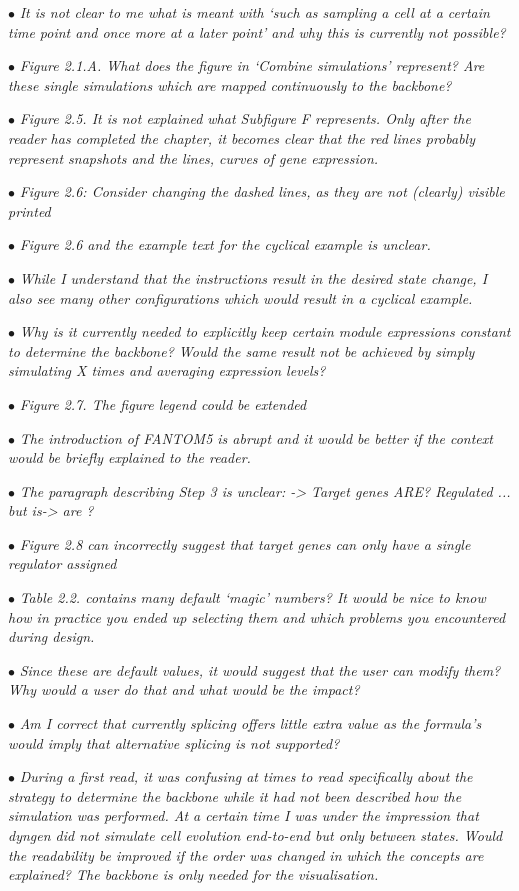 \documentclass[10pt]{article}
\newcommand{\exam}[2][\  ]{\hspace{0pt}\marginpar{\color{red}#1}$\bullet$ \textit{#2}}
\newcommand{\imp}[1]{{\color{red} #1}}
\newcommand{\bigexclaim}{\raisebox{-0.1em}{\BigTriangleUp}\hspace{-0.32em}\llap{\small\textbf{!}}\hspace{0.32em}}
\newcommand{\tagimp}{\bigexclaim}
\newcommand{\tagtime}{{\Large $\hourglass$}}
\begin{document}
{\exam{It is not clear to me what is meant with ‘such as sampling a cell at a certain
	time point and once more at a later point’ and why this is currently not
	possible?}

\exam{Figure 2.1.A. What does the figure in ‘Combine simulations’ represent? Are
		these single simulations which are mapped continuously to the backbone?}

\exam{Figure 2.5. It is not explained what Subfigure F represents. Only after the
	reader has completed the chapter, it becomes clear that the red lines probably
	represent snapshots and the lines, curves of gene expression.}

\exam{Figure 2.6: Consider changing the dashed lines, as they are not (clearly)
		visible printed}
	
\exam{Figure 2.6 and the example text for the cyclical example is unclear.}

\exam{While I
		understand that the instructions result in the desired state change, I also see
		many other configurations which would result in a cyclical example.}
	
\exam{Why is it currently needed to explicitly keep certain module expressions constant to
		determine the backbone? Would the same result not be achieved by simply
		simulating X times and averaging expression levels?}

\exam{Figure 2.7. The figure legend could be extended}

\exam{The introduction of FANTOM5 is abrupt and it would be better if the context
		would be briefly explained to the reader.}
	
\exam{The paragraph describing Step 3 is unclear: -> Target genes ARE? Regulated
		... but is-> are ?}

\exam{Figure 2.8 can incorrectly suggest that target genes can only have a single
		regulator assigned}


\exam[\tagimp \tagtime]{\imp{Table 2.2. contains many default ‘magic’ numbers?} It would be nice to know
		how in practice you ended up selecting them and which problems you
		encountered during design.}


\exam{Since these are default values, it would suggest
		that the user can modify them? Why would a user do that and what would be
		the impact?}
	
\exam{Am I correct that currently splicing offers little extra value as the formula’s
		would imply that alternative splicing is not supported?}


\exam[\tagimp \tagtime]{\imp{During a first read, it was confusing at times to read specifically about the
	strategy to determine the backbone while it had not been described how the
	simulation was performed.} At a certain time I was under the impression that
	dyngen did not simulate cell evolution end-to-end but only between states.
	Would the readability be improved if the order was changed in which the
	concepts are explained? The backbone is only needed for the visualisation.}


}
\end{document}
